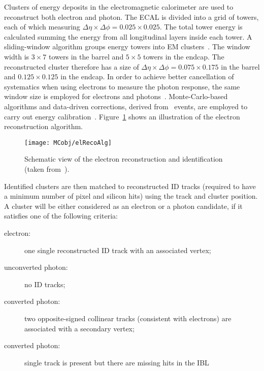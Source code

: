 			Clusters of energy deposits in the electromagnetic calorimeter are used to reconstruct both electron and photon. The \ac{ECAL} is divided into a grid of towers, each of which measuring $\Delta \eta \times \Delta \phi = 0.025 \times 0.025$. The total tower energy is calculated summing the energy from all longitudinal layers inside each tower. A sliding-window algorithm groups energy towers into \ac{EM} clusters~\cite{ATL-PHYS-PUB-2016-015,Aad:2014nim}. The window width is $3 \times 7$ towers in the barrel and $5 \times 5$ towers in the endcap. The reconstructed cluster therefore has a size of $\Delta \eta \times \Delta \phi = 0.075 \times 0.175$ in the barrel and $0.125 \times 0.125$ in the endcap. In order to achieve better cancellation of systematics when using electrons to measure the photon response, the same window size is employed for electrons and photons~\cite{ATL-PHYS-PUB-2016-015}. Monte-Carlo-based algorithms and data-driven corrections, derived from \Zee\ events, are employed to carry out energy calibration~\cite{ATL-PHYS-PUB-2016-015}. Figure~\ref{fig:elRecoAlg} shows an illustration of the electron reconstruction algorithm.

			\begin{figure}[!htb]
				\centering
				\texttt{[image: MCobj/elRecoAlg]}
				\caption{\label{fig:elRecoAlg} Schematic view of the electron reconstruction and identification (taken from~\cite{ATLAS:2016iqc}).}
			\end{figure}

			Identified clusters are then matched to reconstructed \ac{ID} tracks (required to have a minimum number of pixel and silicon hits) using the track and cluster position. A cluster will be either considered as an electron or a photon candidate, if it satisfies one of the following criteria:

			\begin{description}
				\item [electron:] one single reconstructed \ac{ID} track with an associated vertex;
				\item [unconverted photon:] no \ac{ID} tracks;
				\item [converted photon:] two opposite-signed collinear tracks (consistent with electrons) are associated with a secondary vertex;
				\item [converted photon:] single track is present but there are missing hits in the \ac{IBL}
			\end{description}

